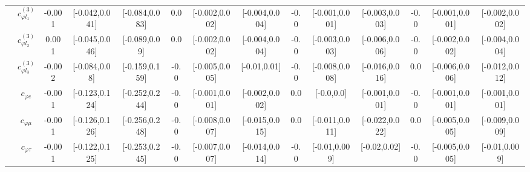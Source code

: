 \documentclass{article}
\begin{document}
\begin{table}[H]
\begin{tabular}{|c|c|c|c|c|c|c|c|c|c|c|c|c|c|}
 & $c_{\varphi l_1}^{(3)}$ & -0.001                             & [-0.042,0.041]                                 & [-0.084,0.083] & 0.0                             & [-0.002,0.002]                                 & [-0.004,0.004] & -0.0                             & [-0.001,0.001]                                 & [-0.003,0.003] & -0.0                             & [-0.001,0.001]                                 & [-0.002,0.002] \\ \cline{2-14}
 & $c_{\varphi l_2}^{(3)}$ & 0.001                             & [-0.045,0.046]                                 & [-0.089,0.09] & 0.0                             & [-0.002,0.002]                                 & [-0.004,0.004] & -0.0                             & [-0.003,0.003]                                 & [-0.006,0.006] & -0.0                             & [-0.002,0.002]                                 & [-0.004,0.004] \\ \cline{2-14}
 & $c_{\varphi l_3}^{(3)}$ & -0.002                             & [-0.084,0.08]                                 & [-0.159,0.159] & -0.0                             & [-0.005,0.005]                                 & [-0.01,0.01] & -0.0                             & [-0.008,0.008]                                 & [-0.016,0.016] & 0.0                             & [-0.006,0.006]                                 & [-0.012,0.012] \\ \cline{2-14}
 & $c_{\varphi e}$ & -0.001                             & [-0.123,0.124]                                 & [-0.252,0.244] & -0.0                             & [-0.001,0.001]                                 & [-0.002,0.002] & 0.0                             & [-0.0,0.0]                                 & [-0.001,0.001] & -0.0                             & [-0.001,0.001]                                 & [-0.001,0.001] \\ \cline{2-14}
 & $c_{\varphi \mu}$ & -0.001                             & [-0.126,0.126]                                 & [-0.256,0.248] & -0.0                             & [-0.008,0.007]                                 & [-0.015,0.015] & 0.0                             & [-0.011,0.011]                                 & [-0.022,0.022] & 0.0                             & [-0.005,0.005]                                 & [-0.009,0.009] \\ \cline{2-14}
 & $c_{\varphi \tau}$ & -0.001                             & [-0.122,0.125]                                 & [-0.253,0.245] & -0.0                             & [-0.007,0.007]                                 & [-0.014,0.014] & -0.0                             & [-0.01,0.009]                                 & [-0.02,0.02] & -0.0                             & [-0.005,0.005]                                 & [-0.01,0.009] \\ \cline{2-14}

\end{tabular}
\end{table}
\end{document}
